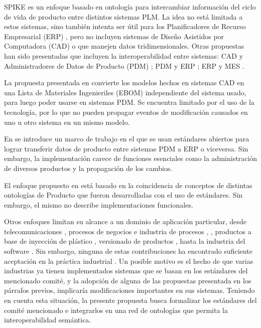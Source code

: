 \documentclass[journal]{IEEEtran}
\begin{document}
SPIKE es un enfoque basado en ontolog\'ia para intercambiar informaci\'on del ciclo de vida de producto entre distintos sistemas PLM. La idea no est\'a limitada a estos sistemas, sino tambi\'en intenta ser \'util para los Planificadores de Recurso Empresarial (ERP) \cite{Bruno2016}, pero no incluyen sistemas de Dise\~no Asistidos por Computadora (CAD) o que manejen datos tridimensionales. Otras propuestas han sido presentadas que incluyen la interoperabilidad entre sistemas: CAD y Administradores de Datos de Producto (PDM) \cite{Paviot2011b}; PDM y ERP \cite{Paviot2011h}; ERP y MES \cite{Tursi2009}.

La propuesta presentada en \cite{Paviot2011b} convierte los modelos hechos en sistemas CAD en una Lista de Materiales Ingenieriles (EBOM) independiente del sistema usado, para luego poder usarse en sistemas PDM. Se encuentra limitado por el uso de la tecnolog\'ia, por lo que no pueden propagar eventos de modificaci\'on causados en uno u otro sistema en un mismo modelo. 

En \cite{Paviot2011h} se introduce un marco de trabajo en el que se usan est\'andares abiertos para lograr transferir datos de producto entre sistemas PDM a ERP o viceversa. Sin embargo, la implementaci\'on carece de funciones esenciales como la administraci\'on de diversos productos y la propagaci\'on de los cambios. 

El enfoque propuesto en \cite{Tursi2009} est\'a basado en la coincidencia de conceptos de distintas ontolog\'ias de Producto que fueron desarrolladas con el uso de est\'andares. Sin embargo, el mismo no describe implementaciones funcionales.

Otros enfoques limitan su alcance a un dominio de aplicaci\'on particular, desde telecomunicaciones \cite{10.1007/978-3-319-73450-7_73}, procesos de negocios \cite{Silega2014} e industria de procesos \cite{JonAtleGulla}, \cite{Marquardt2010}, productos a base de inyección de plástico \cite{CurideMouraLeite201713}, versionado de productos \cite{Sonzini2016UnaProducto}, hasta la industria del software \cite{Isotani2015}. Sin embargo, ninguna de estas contribuciones ha encontrado suficiente aceptaci\'on en la pr\'actica industrial \cite{Wiesner2011}.  Un posible motivo es el hecho de que varias industrias ya tienen implementados sistemas que se basan en los est\'andares del mencionado comit\'e, y la adopci\'on de alguna de las propuestas presentada en los p\'arrafos previos, implicar\'ia modificaciones importantes en sus sistemas.  Teniendo en cuenta esta situaci\'on, la presente propuesta busca formalizar los est\'andares del comit\'e mencionado e integrarlos en una red de ontolog\'ias que permita la interoperabilidad sem\'antica. 
\end{document}
